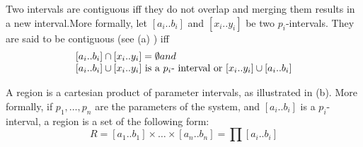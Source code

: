 	\begin{figure}[t]
		\begin{center}
		\end{center}
	\end{figure}


\begin{definition}
\label{pers02.def:Contiguous-intervals}
Two intervals are contiguous iff they do not overlap and merging them results in a new interval.More formally, let $\left[a_{i}..b_{i}\right]$ and $\left[x_{i}..y_{i}\right]$
be two $p_{i}$-intervals. They are said to be contiguous (see (a) ) iff
\begin{align}\begin{array}{l}
	\left[a_{i}..b_{i}\right]\cap\left[x_{i}..y_{i}\right]=\emptyset \mbox{      and} \\
	\left[a_{i}..b_{i}\right]\cup\left[x_{i}..y_{i}\right]$ is a $p_{i}$-
interval or $\left[x_{i}..y_{i}\right]\cup\left[a_{i}..b_{i}\right]
\end{array}\end{align}
\end{definition}

\begin{definition}[Region] 
A region is a cartesian product of parameter intervals, as illustrated in  (b). More formally, if $p_1,\dots,p_n$ are the parameters of the system, and $\left[ a_{i}..b_{i} \right]$ is a $p_i$-interval, a region is a set of the following form:
\[
R=\left[a_{1}..b_{1}\right]\times\dots\times\left[a_{n}..b_{n}\right]=\prod\left[a_{i}..b_{i}\right]
\]
\end{definition}


